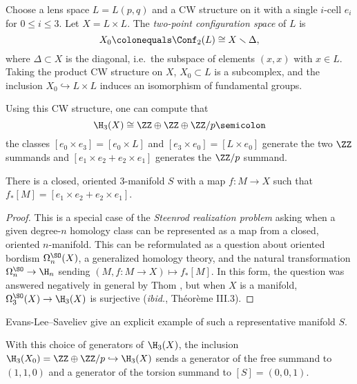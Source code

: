 Choose a lens space $L=L(p,q)$ and a CW structure on it with a single $i$-cell $e_i$ for $0\le i\le 3$. Let $X =
L\times L$. The \textit{two-point configuration space} of $L$ is
\begin{equation}
  X_0 \colonequals \Conf_2(L) \cong X \smallsetminus \Delta,
\end{equation}
where $\Delta\subset X$ is the diagonal, i.e.\ the subspace of elements $(x, x)$ with $x\in L$. Taking the
product CW structure on $X$, $X_0\subset L$ is a subcomplex, and the inclusion $X_0\hookrightarrow L\times
L$ induces an isomorphism of fundamental groups.

Using this CW structure, one can compute that
\begin{equation*}
  \H_3(X)\cong\ZZ\oplus\ZZ\oplus\ZZ/p \semicolon
\end{equation*}
the classes $[e_0\times e_3]=[e_0\times L]$ and $[e_3\times e_0]=[L\times e_0]$ generate the two $\ZZ$ summands and $[e_1\times
e_2 + e_2\times e_1]$ generates the $\ZZ/p$ summand.

\begin{lemma}
  There is a closed, oriented $3$-manifold $S$ with a map $f\colon M\to X$ such that $f_*[M] = [e_1\times e_2
  + e_2\times e_1]$.
\end{lemma}

\begin{proof}
  This is a special case of the \textit{Steenrod realization problem} asking when a given degree-$n$ homology class
  can be represented as a map from a closed, oriented $n$-manifold. This can be reformulated as a question about
  oriented bordism $\Omega_n^{\SO}(X)$, a generalized homology
  theory, and the natural
  transformation $\Omega_n^{\SO}\to\H_n$ sending $(M, f\colon M\to X)\mapsto f_*[M]$. In this
  form, the question was answered negatively in general by Thom \cite[Théorème III.9]{ThomThesis}, but when $X$ is a
  manifold, $\Omega_3^{\SO}(X)\to\H_3(X)$ is surjective (\textit{ibid.}, Théorème III.3).
\end{proof}

\noindent Evans-Lee--Saveliev \cite[\S 3]{deletedsquare} give an explicit example of such a representative manifold $S$.

With this choice of generators of $\H_3(X)$, the inclusion $\H_3(X_0)=\ZZ\oplus\ZZ/p \hookrightarrow \H_3(X)$
sends a generator of the free summand to $(1,1,0)$ and a generator of the torsion summand to $[S]=(0,0,1)$.

